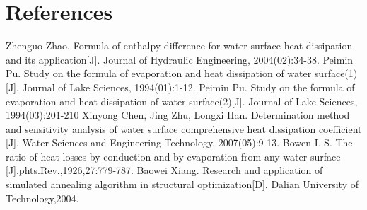 \documentclass{mcmthesis}
\begin{document}
\section{References}
\begin{thebibliography}{99}
Zhenguo Zhao. Formula of enthalpy difference for water surface heat dissipation and its application[J]. Journal of Hydraulic Engineering, 2004(02):34-38.
Peimin Pu. Study on the formula of evaporation and heat dissipation of water surface(1)[J]. Journal of Lake Sciences, 1994(01):1-12.
Peimin Pu. Study on the formula of evaporation and heat dissipation of water surface(2)[J]. Journal of Lake Sciences, 1994(03):201-210
Xinyong Chen, Jing Zhu, Longxi Han. Determination method and sensitivity analysis of water surface comprehensive heat dissipation coefficient [J]. Water Sciences and Engineering Technology, 2007(05):9-13.
Bowen L S. The ratio of heat losses by conduction and by evaporation from any water surface [J].phts.Rev.,1926,27:779-787.
 Baowei Xiang. Research and application of simulated annealing algorithm in structural optimization[D]. Dalian University of Technology,2004.
\end{thebibliography}


\begin{appendices}
\end{appendices}
\end{document}
